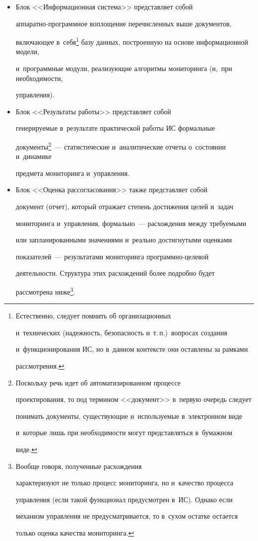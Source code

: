 \begin{itemize}
\item[В.] Блок <<Информационная система>> представляет собой  


ап\-па\-рат\-но-про\-граммное воплощение перечисленных выше документов, 


включающее в~себя\footnote{Естественно, следует помнить об организационных 


и~технических (надежность, безопасность и~т.\,п.)\ вопросах создания 


и~функционирования ИС, но в~данном контексте они оставлены за рамками 


рассмотрения.} базу данных, построенную на основе информационной модели, 


и~про\-грам\-мные модули, реализующие алгоритмы мониторинга (и,~при необходимости, 


управления).\\[-15pt]


     \item[Г.] Блок <<Результаты работы>> представляет собой 


генерируемые в~результате практической работы ИС формальные 


документы\footnote{Поскольку речь идет об автоматизированном процессе 


проектирования, то под термином <<документ>> в~первую очередь следует 


понимать документы, существующие и~используемые в~электронном виде 


и~которые лишь при необходимости могут представляться в~бумажном 


виде.}~--- статистические и~аналитические отчеты о~состоянии и~динамике 


предмета мониторинга и~управ\-ления.\\[-15pt]


     \item[Д.] Блок <<Оценка рассогласования>> также представляет собой 


документ (отчет), который отражает степень достижения целей и~задач 


мониторинга и~управления, формально~--- расхождения между требуемыми 


или запланированными значениями и~реально достигнутыми оценками 


показателей~--- результатами мониторинга про\-граммно-це\-ле\-вой 


деятельности. Структура этих расхождений более подробно будет 


рассмотрена ниже\footnote{Вообще говоря, полученные расхождения 


характеризуют не только процесс мониторинга, но и~качество процесса 


управления (если такой функционал предусмотрен в~ИС). Однако если 


механизм управления не предусматривается, то в~сухом остатке остается 


только оценка качества мониторинга.}.


     \end{itemize}


